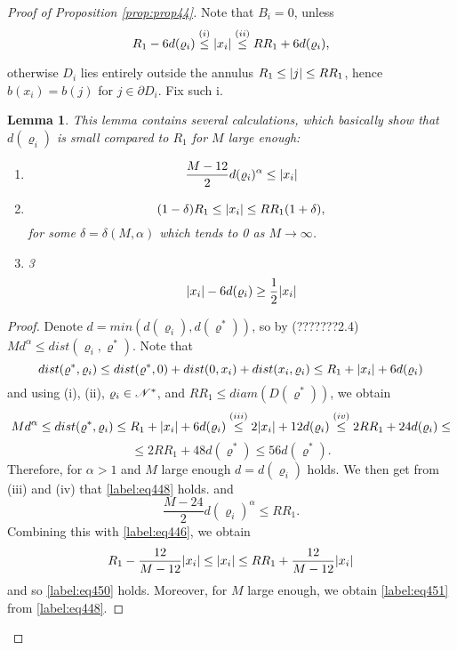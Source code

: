 \documentclass[11pt,reqno]{article}
\DeclarePairedDelimiter\abs{\lvert}{\rvert}%
\newtheorem{lemma}[thm]{Lemma}
\theoremstyle{definition}
\numberwithin{equation}{section}
\begin{document}
\begin{proof}[Proof of Proposition \eqref{prop:prop44}]
Note that $B_i=0$, unless 
\begin{equation} \label{label:eq446}
R_1-6d(\varrho_i) \overset{(i)}{\leq} \abs{x_i} \overset{(ii)}{\leq} RR_1 + 6d(\varrho_i),
\end{equation}

otherwise $D_i$ lies entirely outside the annulus $R_1 \leq \abs{j} \leq RR_1$, hence $b(x_i)=b(j)$ for $j \in \partial D_i$.
Fix such i. 

\begin{lemma}
This lemma contains several calculations, which basically show that $d(\varrho_i)$ is small compared to $R_1$ for $M$ large enough:
\begin{enumerate}
\item 
\begin{equation} \label{label:eq448}
\frac{M-12}{2}d(\varrho_i)^\alpha \leq \abs{x_i}
\end{equation}
\item 
\begin{equation} \label{label:eq450}
(1-\delta) R_1 \leq \abs{x_i} \leq RR_1(1+\delta),
\end{equation}
for some $\delta = \delta(M,\alpha)$ which tends to 0 as $M \rightarrow \infty$.
\item 3
\begin{equation} \label{label:eq451}
\abs{x_i} - 6d(\varrho_i) \geq \frac{1}{2} \abs{x_i}
\end{equation}
\end{enumerate}
\end{lemma}
\begin{proof}

Denote $d = min(d(\varrho_i), d(\varrho^*))$, so by (???????2.4) $ Md^\alpha \leq dist(\varrho_i, \varrho^*) $. Note that
$$
dist(\varrho^*, \varrho_i) \leq dist(\varrho^*, 0) + dist(0, x_i) + dist(x_i, \varrho_i) \leq R_1 + \abs{x_i} + 6d(\varrho_i)
$$
and using (i), (ii), $\varrho_i \in \mathscr{N}^*$, and $RR_1 \leq diam(D(\varrho^*))$, we obtain
$$
Md^\alpha \leq dist(\varrho^*, \varrho_i) \leq R_1 + \abs{x_i} + 6d(\varrho_i) \overset{(iii)}{\leq} 2\abs{x_i} + 12d(\varrho_i) \overset{(iv)}{\leq} 2RR_1 + 24 d(\varrho_i) \leq 
$$
$$
\leq 2RR_1 + 48 d(\varrho^*)  \leq 56d(\varrho^*).
$$
Therefore, for $\alpha > 1$ and $M$ large enough $d=d(\varrho_i)$ holds. We then get from (iii) and (iv) that \eqref{label:eq448} holds.
and %
$$
\frac{M-24}{2}d(\varrho_i)^\alpha \leq RR_1.  
$$
Combining this with \eqref{label:eq446}, we obtain
$$
R_1 - \frac{12}{M-12} \abs{x_i} \leq \abs{x_i} \leq RR_1 + \frac{12}{M-12}\abs{x_i}
$$
and so \eqref{label:eq450} holds.
Moreover, for $M$ large enough, we obtain \eqref{label:eq451} from \eqref{label:eq448}.
\end{proof}



\end{proof}
\end{document}
